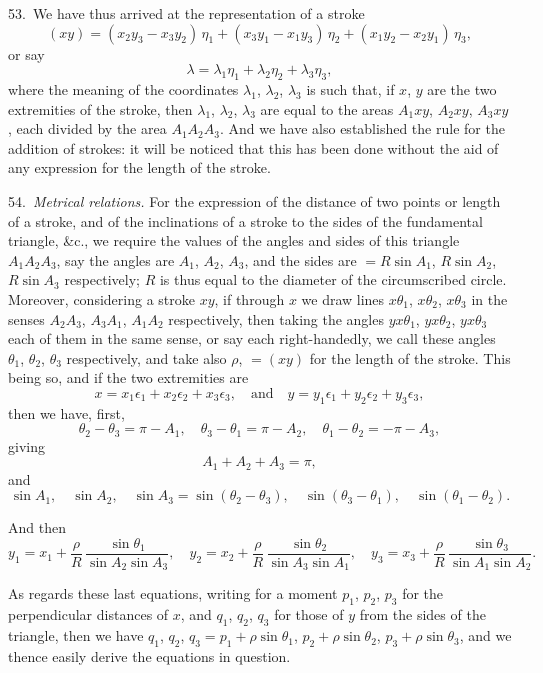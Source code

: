 \documentclass[11pt,a4paper]{book}
\begin{document}
53.\ We have thus arrived at the representation of a stroke
\[
(xy) = (x_2 y_3 - x_3 y_2)\, \eta_1 + (x_3 y_1 - x_1 y_3)\, \eta_2 + (x_1 y_2 - x_2 y_1)\, \eta_3,
\]
or say
\[
\lambda = \lambda_1 \eta_1 + \lambda_2 \eta_2 + \lambda_3 \eta_3,
\]
where the meaning of the coordinates $\lambda_1$, $\lambda_2$, $\lambda_3$ is such that, if $x$, $y$
are the two extremities of the stroke, then $\lambda_1$, $\lambda_2$, $\lambda_3$ are equal to the areas
$A_1 xy$, $A_2 xy$, $A_3 xy$, each divided by the area $A_1 A_2 A_3$.
And we have also established the rule for the addition of strokes: it will be noticed
that this has been done without the aid of any expression for the length of the stroke.

54.\ \textit{Metrical relations.} For the expression of the distance of two points or length
of a stroke, and of the inclinations of a stroke to the sides of the fundamental triangle,
\&c., we require the values of the angles and sides of this triangle $A_1 A_2 A_3$, say the
angles are $A_1$, $A_2$, $A_3$, and the sides are $= R \sin A_1$, $R \sin A_2$, $R \sin A_3$
respectively; $R$ is thus equal to the diameter of the circumscribed circle.
Moreover, considering a stroke $xy$, if through $x$ we draw lines $x\theta_1$, $x\theta_2$, $x\theta_3$
in the senses $A_2 A_3$, $A_3 A_1$, $A_1 A_2$ respectively, then taking the angles
$yx\theta_1$, $yx\theta_2$, $yx\theta_3$ each of them in the same sense, or say each right-handedly,
we call these angles $\theta_1$, $\theta_2$, $\theta_3$ respectively, and take also $\rho$, $= (xy)$ for
the length of the stroke. This being so, and if the two extremities are
\[
x = x_1 \epsilon_1 + x_2 \epsilon_2 + x_3 \epsilon_3, \quad \text{and} \quad
y = y_1 \epsilon_1 + y_2 \epsilon_2 + y_3 \epsilon_3,
\]
then we have, first,
\[
\theta_2 - \theta_3 = \pi - A_1, \quad
\theta_3 - \theta_1 = \pi - A_2, \quad
\theta_1 - \theta_2 = -\pi - A_3,
\]
giving
\[
A_1 + A_2 + A_3 = \pi,
\]
and
\[
\sin A_1, \quad \sin A_2, \quad \sin A_3
= \sin(\theta_2 - \theta_3), \quad \sin(\theta_3 - \theta_1), \quad \sin(\theta_1 - \theta_2).
\]

And then
\[
y_1 = x_1 + \frac{\rho}{R}\, \frac{\sin \theta_1}{\sin A_2 \sin A_3}, \quad
y_2 = x_2 + \frac{\rho}{R}\, \frac{\sin \theta_2}{\sin A_3 \sin A_1}, \quad
y_3 = x_3 + \frac{\rho}{R}\, \frac{\sin \theta_3}{\sin A_1 \sin A_2}.
\]

As regards these last equations, writing for a moment $p_1$, $p_2$, $p_3$ for the perpendicular
distances of $x$, and $q_1$, $q_2$, $q_3$ for those of $y$ from the sides of the triangle,
then we have $q_1$, $q_2$, $q_3 = p_1 + \rho \sin \theta_1$, $p_2 + \rho \sin \theta_2$,
$p_3 + \rho \sin \theta_3$, and we thence easily derive the equations in question.
\end{document}
